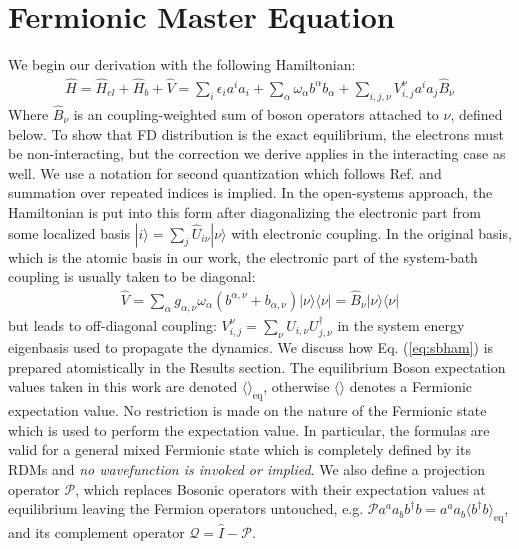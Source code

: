 \documentclass[aip,jcp,preprint,floatfix]{revtex4-1}
\begin{document}
{\section{Fermionic Master Equation}
\indent We begin our derivation with the following Hamiltonian: 
\begin{align}
    \hat{H} = \hat{H}_{el} + \hat{H}_b+ \hat{V} = \sum_{i} \epsilon_i a^i a_i + \sum_{\alpha}\omega_\alpha b^\alpha b_\alpha +\sum_{i,j,\nu} V_{i,j}^\nu a^ia_j \hat{B}_\nu
\label{eq:sbham}
\end{align}
Where $\hat{B}_\nu$ is an coupling-weighted sum of boson operators attached to $\nu$, defined below. To show that FD distribution is the exact equilibrium, the electrons must be non-interacting, but the correction we derive applies in the interacting case as well. We use a notation for second quantization which follows Ref. \cite{Kutzelnigg:1997aa} and summation over repeated indices is implied. 
In the open-systems approach, the Hamiltonian is put into this form after diagonalizing the electronic part from some localized basis $|i\rangle =\sum_j \hat{U}_{i\nu} |\nu\rangle$ with electronic coupling. In the original basis, which is the atomic basis in our work, the electronic part of the system-bath coupling is usually taken to be diagonal:
\begin{align}
\hat{V} = \sum_\alpha g_{\alpha,\nu}\omega_\alpha(b^{\alpha,\nu}+b_{\alpha,\nu})|\nu \rangle \langle \nu| = \hat{B}_\nu |\nu \rangle \langle \nu|
\end{align}
but leads to off-diagonal coupling: $V^\nu_{i,j} = \sum_\nu {U}_{i,\nu}{U}^\dagger_{j,\nu}$ in the system energy eigenbasis used to propagate the dynamics. We discuss how Eq. (\ref{eq:sbham}) is prepared atomistically in the Results section. The equilibrium Boson expectation values taken in this work are denoted $\langle \rangle_\text{eq}$, otherwise $\langle \rangle $ denotes a Fermionic expectation value. No restriction is made on the nature of the Fermionic state which is used to perform the expectation value. In particular, the formulas are valid for a general mixed Fermionic state which is completely defined by its RDMs and \emph{no wavefunction is invoked or implied}. We also define a projection operator $\mathcal{P}$, which replaces Bosonic operators with their expectation values at equilibrium leaving the Fermion operators untouched, e.g. $\mathcal{P} a^{a}a_{b}b^\dagger b=a^{a}a_b \langle b^\dagger b \rangle_\text{eq}$, and its complement operator $\mathcal{Q} = \hat{I} - \mathcal{P}$.  \\
}
\end{document}
